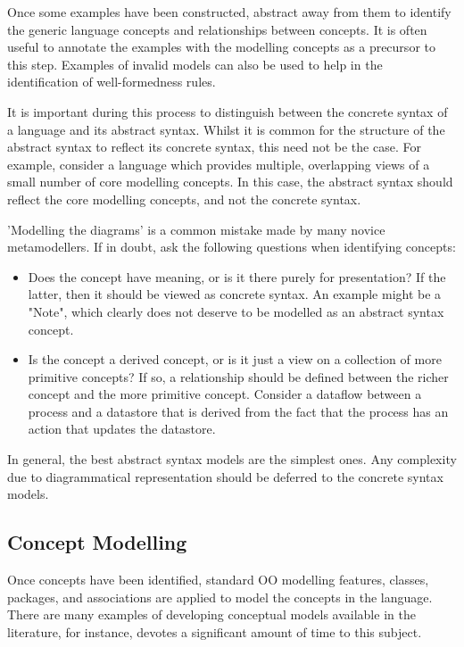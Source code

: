 Once some examples have been constructed, abstract away from them to identify the generic language concepts and relationships between concepts. It is often useful to annotate the examples with the modelling concepts as a precursor to this step. Examples of invalid models can also be used to help in the identification of well-formedness rules. 

It is important during this process to distinguish between the concrete syntax of a language and its abstract syntax. Whilst it is common for the structure of the abstract syntax to reflect its concrete syntax, this need not be the case. For example, consider a language which provides multiple, overlapping views of a small number of core modelling concepts. In this case, the abstract syntax should reflect the core modelling concepts, and not the concrete syntax. 

'Modelling the diagrams' is a common mistake made by many novice metamodellers. If in doubt, ask the following questions when identifying concepts:

\begin{itemize}
\item Does the concept have meaning, or is it there purely for presentation? If the latter, then it should be viewed as concrete syntax. An example might be a "Note", which clearly does not deserve to be modelled as an abstract syntax concept.
\item Is the concept a derived concept, or is it just a view on a collection of more primitive concepts? If so, a relationship should be defined between the richer concept and the more primitive concept. Consider a dataflow between a process and a datastore that is derived from the fact that the process has an action that updates the datastore. 
\end{itemize}

In general, the best abstract syntax models are the simplest ones. Any complexity due to diagrammatical representation should be deferred to the concrete syntax models.

\subsection{Concept Modelling}

Once concepts have been identified, standard OO modelling features, classes, packages, and associations are applied to model the concepts in the language. There are many examples of developing conceptual models available in the literature, for instance, \cite{Larman} devotes a significant amount of time to this subject. 

